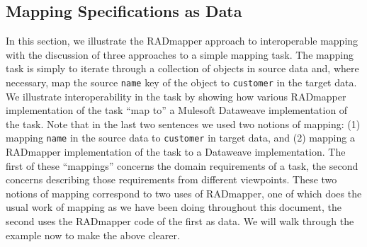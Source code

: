 \documentclass[10pt,letterpaper]{article} %
\newcommand{\stt}[1]{\texttt{#1}} %
\begin{document}


\subsection{Mapping Specifications as Data}

In this section, we illustrate the RADmapper approach to interoperable mapping with the discussion of three approaches to a simple mapping task.
The mapping task is simply to iterate through a collection of objects in source data and, where necessary, map the source \stt{name} key of the object to \stt{customer} in the target data.
We illustrate interoperability in the task by showing how various RADmapper implementation of the task ``map to'' a Mulesoft Dataweave implementation of the task.
Note that in the last two sentences we used two notions of mapping:
(1) mapping \stt{name} in the source data to \stt{customer} in target data, and
(2) mapping a RADmapper implementation of the task to a Dataweave implementation.
The first of these ``mappings'' concerns the domain requirements of a task, the second concerns describing those requirements from different viewpoints.
These two notions of mapping correspond to two uses of RADmapper, one of which does the usual work of mapping as we have been doing throughout this document, the second uses the RADmapper code of the first as data.
We will walk through the example now to make the above clearer.
\end{document}
